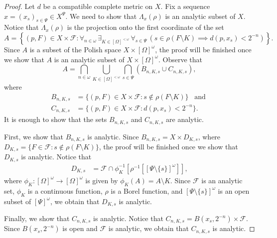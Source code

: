 \documentclass{amsart}
\theoremstyle{plain}
\theoremstyle{definition}
\theoremstyle{remark}
\newcommand{\cF}{\mathcal{F}}
\begin{document}
\begin{proof}
Let $d$ be a compatible complete metric on $X$.
Fix a sequence $x=(x_s)_{s\in\Psi}\in X^\Psi$. We need to show that $\Lambda_x(\rho)$ is an analytic subset of $X$. 
Notice that  $\Lambda_{x}(\rho)$ is the projection onto the first coordinate of the set
\begin{equation*}
    A = \left\{(p,F)\in X\times \cF: \forall_{n\in \omega}\, \exists_{K\in [\Omega]^{<\omega}}\, \forall_{s\in \Psi}\, (s\in \rho(F\setminus K)\implies d(p,x_s)<2^{-n})\right\}.
\end{equation*}
Since $A$ is a subset of the Polish space $X\times [\Omega]^\omega$,  the proof will be finished once we show that $A$ is an analytic subset of $X\times [\Omega]^\omega$.
Observe that
\begin{equation*}
    A = \bigcap_{n\in \omega}\bigcup_{K\in [\Omega]^{<\omega}}\bigcap_{s\in \Psi} (B_{n,K,s}\cup C_{n,K,s}),
\end{equation*}
where 
\begin{equation*}
\begin{split}
    B_{n,K,s} &= \{(p,F)\in X\times\cF:s\notin \rho(F\setminus K)\} \,\,\,\text{ and }
    \\
    C_{n,K,s}&=\{(p,F)\in X\times\cF: d(p,x_s)<2^{-n}\}.
\end{split}
\end{equation*}
It is enough to show that the sets $B_{n,K,s}$ and $C_{n,K,s}$ are analytic. 

First, we show that $B_{n,K,s}$ is analytic.
Since 
$B_{n,K,s}=X\times D_{K,s}$, 
where 
$D_{K,s} = \{F\in \cF:s\notin \rho(F\setminus K)\}$, 
the proof will be finished once we show that 
$D_{K,s}$ is analytic.
Notice that 
\begin{equation*}
    \begin{split}
D_{K,s}
&=
\cF\cap \phi^{-1}_K\left[\rho^{-1}\left[\left[\Psi\setminus\{s\}\right]^\omega\right]\right],
    \end{split}
\end{equation*}
where $\phi_K:[\Omega]^\omega\to [\Omega]^\omega$ is given by $\phi_K(A)=A\setminus K$.
Since 
$\cF$ is an analytic set, 
$\phi_K$  is a continuous function, $\rho$ is a Borel function,  
and $\left[\Psi\setminus\{s\}\right]^\omega$ is an open subset of $[\Psi]^\omega$, we obtain that $D_{K,s}$ is analytic.


Finally, we show that $C_{n,K,s}$ is analytic.
Notice that 
$C_{n,K,s}=B(x_s,2^{-n})\times \cF$.
Since $B(x_s,2^{-n})$ is open and $\cF$ is analytic, we obtain that $C_{n,K,s}$ is analytic. 
\end{proof}
\end{document}
